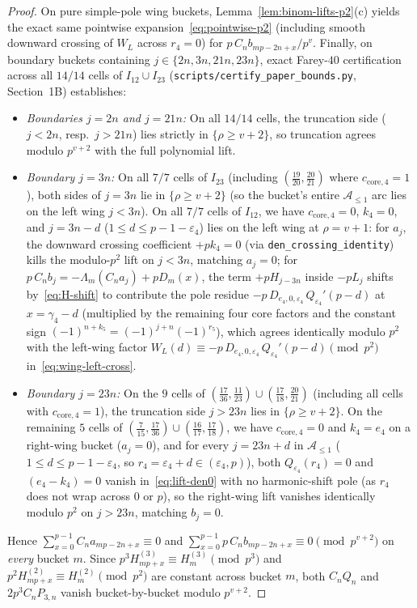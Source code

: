 \documentclass[11pt,reqno]{amsart}
\theoremstyle{definition}
\theoremstyle{remark}
\begin{document}
\begin{proof}
On pure simple-pole wing buckets, Lemma~\ref{lem:binom-lifts-p2}(c) yields the exact same pointwise expansion~\eqref{eq:pointwise-p2} (including smooth downward crossing of $W_L$ across $r_4 = 0$) for $p\,C_n b_{mp-2n+x}/p^v$. Finally, on boundary buckets containing $j \in \{2n, 3n, 21n, 23n\}$, exact Farey-$40$ certification across all $14/14$ cells of $I_{12} \cup I_{23}$ (\texttt{scripts/\allowbreak certify\_\allowbreak paper\_\allowbreak bounds.py}, Section~1B) establishes:
\begin{itemize}
  \item \emph{Boundaries $j = 2n$ and $j = 21n$:} On all $14/14$ cells, the truncation side ($j < 2n$, resp.\ $j > 21n$) lies strictly in $\{\rho \ge v + 2\}$, so truncation agrees modulo $p^{v+2}$ with the full polynomial lift.
  \item \emph{Boundary $j = 3n$:} On all $7/7$ cells of $I_{23}$ (including $(\frac{19}{20}, \frac{20}{21})$ where $c_{\mathrm{core}, 4} = 1$), both sides of $j = 3n$ lie in $\{\rho \ge v + 2\}$ (so the bucket's entire $\mathcal{A}_{\le 1}$ arc lies on the left wing $j < 3n$). On all $7/7$ cells of $I_{12}$, we have $c_{\mathrm{core}, 4} = 0$, $k_4 = 0$, and $j = 3n - d$ ($1 \le d \le p - 1 - \varepsilon_4$) lies on the left wing at $\rho = v + 1$: for $a_j$, the downward crossing coefficient $+p k_4 = 0$ (via \texttt{den\_crossing\_identity}) kills the modulo-$p^2$ lift on $j < 3n$, matching $a_j = 0$; for $p\,C_n b_j = -\Lambda_m(C_n a_j) + p D_m(x)$, the term $+p H_{j - 3n}$ inside $-p L_j$ shifts by~\eqref{eq:H-shift} to contribute the pole residue $-p\,D_{e_4, 0, \varepsilon_4}\,Q_{\varepsilon_4}'(p - d)$ at $x = \gamma_4 - d$ (multiplied by the remaining four core factors and the constant sign $(-1)^{n+k_5} = (-1)^{j+n}(-1)^{r_5}$), which agrees identically modulo $p^2$ with the left-wing factor $W_L(d) \equiv -p\,D_{e_4, 0, \varepsilon_4}\,Q_{\varepsilon_4}'(p - d) \pmod{p^2}$ in~\eqref{eq:wing-left-cross}.
  \item \emph{Boundary $j = 23n$:} On the $9$ cells of $(\frac{17}{36}, \frac{11}{23}) \cup (\frac{17}{18}, \frac{20}{21})$ (including all cells with $c_{\mathrm{core}, 4} = 1$), the truncation side $j > 23n$ lies in $\{\rho \ge v + 2\}$. On the remaining $5$ cells of $(\frac{7}{15}, \frac{17}{36}) \cup (\frac{16}{17}, \frac{17}{18})$, we have $c_{\mathrm{core}, 4} = 0$ and $k_4 = e_4$ on a right-wing bucket ($a_j = 0$), and for every $j = 23n + d$ in $\mathcal{A}_{\le 1}$ ($1 \le d \le p - 1 - \varepsilon_4$, so $r_4 = \varepsilon_4 + d \in (\varepsilon_4, p)$), both $Q_{\varepsilon_4}(r_4) = 0$ and $(e_4 - k_4) = 0$ vanish in~\eqref{eq:lift-den0} with no harmonic-shift pole (as $r_4$ does not wrap across $0$ or $p$), so the right-wing lift vanishes identically modulo $p^2$ on $j > 23n$, matching $b_j = 0$.
\end{itemize}
Hence $\sum_{x=0}^{p-1} C_n a_{mp-2n+x} \equiv 0$ and $\sum_{x=0}^{p-1} p\,C_n b_{mp-2n+x} \equiv 0 \pmod{p^{v+2}}$ on \emph{every} bucket $m$. Since $p^3 H_{mp+x}^{(3)} \equiv H_m^{(3)} \pmod{p^3}$ and $p^2 H_{mp+x}^{(2)} \equiv H_m^{(2)} \pmod{p^2}$ are constant across bucket $m$, both $C_n Q_n$ and $2 p^3 C_n P_{3,n}$ vanish bucket-by-bucket modulo $p^{v+2}$.


\end{proof}
\end{document}
